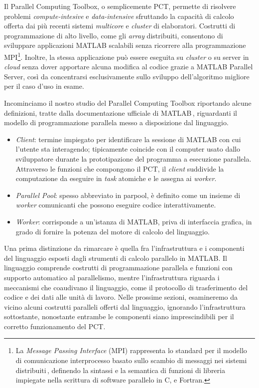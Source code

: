 \nocite{MathWorksParallelComputing}
Il Parallel Computing Toolbox, o semplicemente PCT, permette di risolvere problemi \textit{compute-intesive} e  \textit{data-intensive} sfruttando 
la capacit\`a di calcolo offerta dai pi\`u recenti sistemi \textit{multicore} e \textit{cluster} di elaboratori. \newline
Costrutti di programmazione di alto livello, come gli \textit{array} distribuiti, consentono di sviluppare applicazioni MATLAB scalabili senza ricorrere alla programmazione 
MPI\footnote{La \textit{Message Passing Interface} (MPI) rappresenta lo standard per il modello di comunicazione interprocesso basato sullo scambio 
di messaggi nei sistemi distribuiti\,\cite{NMSUMPIIntro}, definendo la sintassi e la semantica di funzioni di libreria impiegate nella scrittura di software parallelo in C, \CC e Fortran.}.\newline
Inoltre, la stessa applicazione pu\`o essere eseguita su \textit{cluster} o su server in \textit{cloud} senza dover apportare alcuna modifica al codice grazie a MATLAB 
Parallel Server, cos\`i da concentrarsi esclusivamente sullo sviluppo dell'algoritmo migliore per il caso d'uso in esame.

Incominciamo il nostro studio del Parallel Computing Toolbox riportando alcune definizioni, tratte dalla documentazione ufficiale di MATLAB\,\cite{MathWorksWhatIsParallel}, riguardanti il modello di programmazione parallela messo a disposizione dal linguaggio.
\begin{itemize}
\item \textit{Client}: termine impiegato per identificare la sessione di MATLAB con cui l'utente sta interagendo; tipicamente coincide con il 
computer usato dallo sviluppatore durante la prototipazione del programma a esecuzione parallela.\newline
Attraverso le funzioni che compongono il PCT, il \textit{client} suddivide la computazione da eseguire in \textit{task} atomiche e le assegna ai \textit{worker}.
\item \textit{Parallel Pool}: spesso abbreviato in parpool, \`e definito come un insieme di \textit{worker} comunicanti che possono eseguire codice interattivamente.
\item \textit{Worker}: corrisponde a un'istanza di MATLAB, priva di interfaccia grafica, in grado di fornire la potenza del 
motore di calcolo del linguaggio.
\end{itemize}

Una prima distinzione da rimarcare \`e quella fra l'infrastruttura e i componenti del linguaggio esposti dagli strumenti di calcolo parallelo in MATLAB.\newline 
Il linguaggio comprende costrutti di programmazione parallela e funzioni con supporto automatico al parallelismo, mentre l'infrastruttura riguarda i meccanismi che coaudivano il linguaggio, come il protocollo di trasferimento del codice e dei dati alle unit\`a di lavoro. \newline
Nelle prossime sezioni, esamineremo da vicino alcuni costrutti paralleli offerti dal linguaggio, ignorando l'infrastruttura sottostante, nonostante entrambe le componenti 
siano imprescindibili per il corretto funzionamento del PCT.

